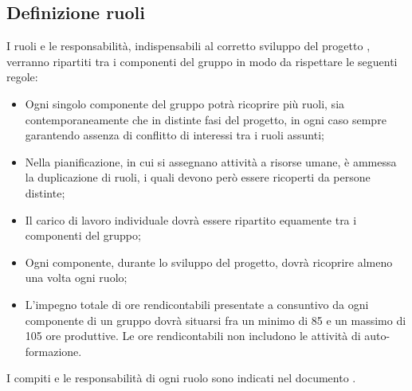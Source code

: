 \documentclass[../PianoDiProgetto.tex]{subfiles}
\begin{document}
		\subsection{Definizione ruoli}
			I ruoli e le responsabilità, indispensabili al corretto sviluppo del progetto \progetto ,  verranno ripartiti tra i componenti del gruppo in modo da rispettare le seguenti regole:
			\begin{itemize}
			\item Ogni singolo componente del gruppo potrà ricoprire più ruoli, sia contemporaneamente che in distinte fasi del progetto, in ogni caso sempre garantendo assenza di conflitto di interessi tra i ruoli assunti;
			\item Nella pianificazione, in cui si assegnano attività a risorse umane, è ammessa la duplicazione di ruoli, i quali devono però essere ricoperti da persone distinte;
			\item Il carico di lavoro individuale dovrà essere ripartito equamente tra i componenti del gruppo;
			\item Ogni componente, durante lo sviluppo del progetto, dovrà ricoprire almeno una volta ogni ruolo;
			\item L'impegno totale di ore rendicontabili presentate a consuntivo da ogni componente di un gruppo dovrà situarsi fra un minimo di 85 e un massimo di 105 ore produttive. Le ore rendicontabili non includono le attività di auto-formazione.
			\end{itemize}
			I compiti e le responsabilità di ogni ruolo sono indicati nel documento \normediprogettov.
		
\end{document}
